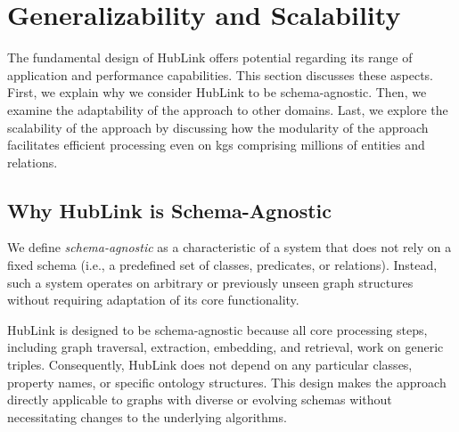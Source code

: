 
\section{Generalizability and Scalability}
\label{sec:hublink_generality_and_chances}

The fundamental design of HubLink offers potential regarding its range of application and performance capabilities. This section discusses these aspects. First, we explain why we consider HubLink to be schema-agnostic. Then, we examine the adaptability of the approach to other domains. Last, we explore the scalability of the approach by discussing how the modularity of the approach facilitates efficient processing even on \glspl{kg} comprising millions of entities and relations.

\subsection{Why HubLink is Schema-Agnostic}

We define \emph{schema-agnostic} as a characteristic of a system that does not rely on a fixed schema (i.e., a predefined set of classes, predicates, or relations). Instead, such a system operates on arbitrary or previously unseen graph structures without requiring adaptation of its core functionality.

HubLink is designed to be schema-agnostic because all core processing steps, including graph traversal, extraction, embedding, and retrieval, work on generic triples. Consequently, HubLink does not depend on any particular classes, property names, or specific ontology structures. This design makes the approach directly applicable to graphs with diverse or evolving schemas without necessitating changes to the underlying algorithms.

